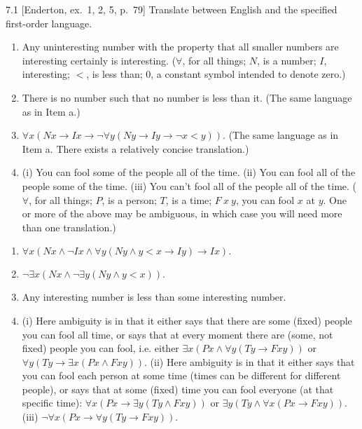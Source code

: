 
\begin{exercise}{7.1}
  [Enderton, ex.~1, 2, 5, p.~79]
  Translate between English and the specified first-order language.
  \begin{enumerate}[label=(\alph*)]
    \item Any uninteresting number with the property that all smaller numbers are interesting certainly is interesting. ($\forall$, for all things; $N$, is a number; $I$, interesting; $<$, is less than; $0$, a constant symbol intended to denote zero.)
    \item There is no number such that no number is less than it. (The same language as in Item a.)
    \item $\forall x(Nx\rightarrow Ix\rightarrow\neg\forall y(Ny\rightarrow Iy\rightarrow\neg x<y))$. (The same language as in Item a. There exists a relatively concise translation.)
    \item (i) You can fool some of the people all of the time. (ii) You can fool all of the people some of the time. (iii) You can't fool all of the people all of the time. ($\forall$, for all things; $P$, is a person; $T$, is a time; $F\ x\ y$, you can fool $x$ at $y$. One or more of the above may be ambiguous, in which case you will need more than one translation.)\qedhere
  \end{enumerate}
\end{exercise}

\begin{enumerate}[label=(\alph*)]
  \item $\forall x(Nx\wedge\neg Ix\wedge\forall y (Ny\wedge y<x\rightarrow Iy)\rightarrow Ix).$
  \item $\neg\exists x(Nx\wedge\neg\exists y(Ny\wedge y<x)).$
  \item Any interesting number is less than some interesting number.
  \item (i) Here ambiguity is in that it either says that there are some (fixed) people you can fool all time, or says that at every moment there are (some, not fixed) people you can fool, i.e. either $\exists x(Px\wedge\forall y(Ty\to Fxy))$ or $\forall y(Ty\to\exists x(Px\wedge Fxy))$. (ii) Here ambiguity is in that it either says that you can fool each person at some time (times can be different for different people), or says that at some (fixed) time you can fool everyone (at that specific time): $\forall x(Px\to\exists y(Ty\wedge Fxy))$ or $\exists y(Ty\wedge\forall x(Px\to Fxy))$. (iii) $\neg\forall x(Px\to\forall y(Ty\to Fxy)).$
\end{enumerate}

